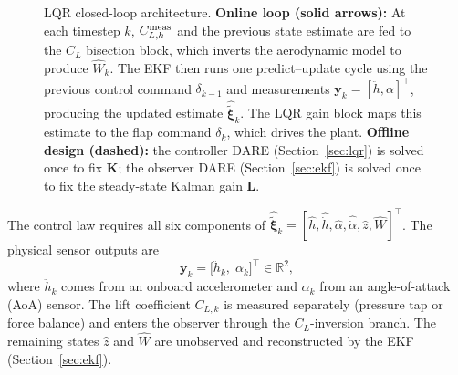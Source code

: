\documentclass[11pt,a4paper]{article}
\newcommand{\vxi}{\bm{\xi}}
\begin{document}
\begin{figure}[htbp]
\begin{tikzpicture}
\end{tikzpicture}
\caption{LQR closed-loop architecture.
         \textbf{Online loop (solid arrows):}
         At each timestep $k$, $C_{L,k}^{\rm meas}$ and the previous state
         estimate are fed to the $C_L$ bisection block, which inverts the
         aerodynamic model to produce $\hat{W}_k$.
         The EKF then runs one predict--update cycle using the previous control
         command $\delta_{k-1}$ and measurements $\mathbf{y}_k=[\ddot{h},\alpha]^\top$,
         producing the updated estimate $\hat{\tilde{\boldsymbol{\xi}}}_k$.
         The LQR gain block maps this estimate to the flap command $\delta_k$,
         which drives the plant.
         \textbf{Offline design (dashed):} the controller DARE (Section~\ref{sec:lqr})
         is solved once to fix $\mathbf{K}$; the observer DARE
         (Section~\ref{sec:ekf}) is solved once to fix the steady-state Kalman
         gain $\mathbf{L}$.}
\label{fig:lqr_block}
\end{figure}

The control law requires all six components of
$\hat{\tilde{\vxi}}_k = [\hat{h},\hat{\dot{h}},\hat{\alpha},\hat{\dot{\alpha}},\hat{z},\hat{W}]^\top$.
The physical sensor outputs are
\begin{equation}
  \mathbf{y}_k = \bigl[\ddot{h}_k,\;\alpha_k\bigr]^\top \in \mathbb{R}^2,
  \label{eq:meas_vec}
\end{equation}
where $\ddot{h}_k$ comes from an onboard accelerometer and $\alpha_k$ from an
angle-of-attack (AoA) sensor.
The lift coefficient $C_{L,k}$ is measured separately (pressure tap or force
balance) and enters the observer through the $C_L$\nobreakdash-inversion
branch.
The remaining states $\hat{z}$ and $\hat{W}$ are unobserved and reconstructed
by the EKF (Section~\ref{sec:ekf}).
\end{document}
